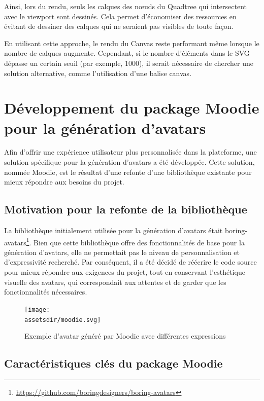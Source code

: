 Ainsi, lors du rendu, seuls les calques des nœuds du Quadtree qui intersectent avec le viewport sont dessinés. Cela permet d'économiser des ressources en évitant de dessiner des calques qui ne seraient pas visibles de toute façon.

En utilisant cette approche, le rendu du Canvas reste performant même lorsque le nombre de calques augmente. Cependant, si le nombre d'éléments dans le SVG dépasse un certain seuil (par exemple, 1000), il serait nécessaire de chercher une solution alternative, comme l'utilisation d'une balise canvas.

\section{Développement du package Moodie pour la génération d'avatars\label{moodie}}

Afin d'offrir une expérience utilisateur plus personnalisée dans la plateforme, une solution spécifique pour la génération d'avatars a été développée. Cette solution, nommée Moodie, est le résultat d'une refonte d'une bibliothèque existante pour mieux répondre aux besoins du projet.

\subsection{Motivation pour la refonte de la bibliothèque}

La bibliothèque initialement utilisée pour la génération d'avatars était boring-avatars\footnote{\url{https://github.com/boringdesigners/boring-avatars}}. Bien que cette bibliothèque offre des fonctionnalités de base pour la génération d'avatars, elle ne permettait pas le niveau de personnalisation et d'expressivité recherché. Par conséquent, il a été décidé de réécrire le code source pour mieux répondre aux exigences du projet, tout en conservant l'esthétique visuelle des avatars, qui correspondait aux attentes et de garder que les fonctionnalités nécessaires.

\begin{figure}[H]
    \centering
    \texttt{[image: \\assetsdir/moodie.svg]}
    \caption{Exemple d'avatar généré par Moodie avec différentes expressions}
\end{figure}

\subsection{Caractéristiques clés du package Moodie}


